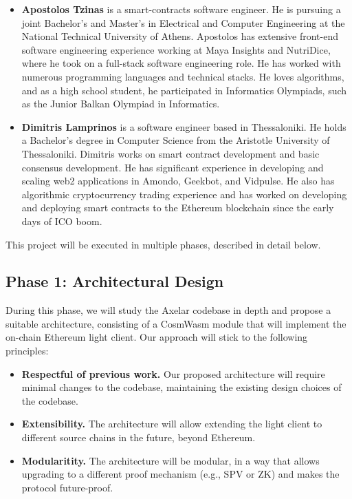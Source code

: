 \begin{itemize}
  \item \textbf{Apostolos Tzinas} is a smart-contracts software engineer. He is pursuing a joint Bachelor’s and Master’s in Electrical and Computer Engineering at the National Technical University of Athens. Apostolos has extensive front-end software engineering experience working at Maya Insights and NutriDice, where he took on a full-stack software engineering role. He has worked with numerous programming languages and technical stacks. He loves algorithms, and as a high school student, he participated in Informatics Olympiads, such as the Junior Balkan Olympiad in Informatics. 
  \item \textbf{Dimitris Lamprinos} is a software engineer based in Thessaloniki. He holds a Bachelor’s degree in Computer Science from the Aristotle University of Thessaloniki. Dimitris works on smart contract development and basic consensus development. He has significant experience in developing and scaling web2 applications in Amondo, Geekbot, and Vidpulse. He also has algorithmic cryptocurrency trading experience and has worked on developing and deploying smart contracts to the Ethereum
    blockchain since the early days of ICO boom.
\end{itemize}

This project will be executed in multiple phases, described in detail below.

\subsection{Phase 1: Architectural Design}
During this phase, we will study the Axelar codebase in depth and propose a suitable architecture, consisting of a CosmWasm module that will implement the on-chain Ethereum light client.
Our approach will stick to the following principles: 
\begin{itemize}
  \item \textbf{Respectful of previous work.} Our proposed architecture will require minimal changes to the codebase, maintaining the existing design choices of the codebase.
  \item \textbf{Extensibility.} The architecture will allow extending the light client to different source chains in the future, beyond Ethereum.
  \item \textbf{Modularitity.} The architecture will be modular, in a way that allows upgrading to a different proof mechanism (e.g., SPV or ZK) and makes the protocol future-proof.
\end{itemize}

